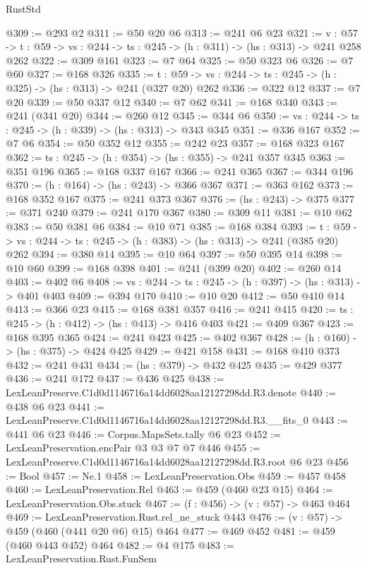 \begin{lexlean}{RustStd}
\begin{coremodule}
@309 := @293 @2
@311 := @50 @20 @6
@313 := @241 @6 @23
@321 := {v : @57} ->
  {t : @59} -> {vs : @244} -> {ts : @245} -> (h : @311) -> (hs : @313) -> @241 @258 @262
@322 := @309 @161
@323 := @7 @64
@325 := @50 @323 @6
@326 := @7 @60
@327 := @168 @326
@335 := {t : @59} -> {vs : @244} -> {ts : @245} -> (h : @325) -> (hs : @313) -> @241 (@327 @20) @262
@336 := @322 @12
@337 := @7 @20
@339 := @50 @337 @12
@340 := @7 @62
@341 := @168 @340
@343 := @241 (@341 @20)
@344 := @260 @12
@345 := @344 @6
@350 := {vs : @244} -> {ts : @245} -> (h : @339) -> (hs : @313) -> @343 @345
@351 := @336 @167
@352 := @7 @6
@354 := @50 @352 @12
@355 := @242 @23
@357 := @168 @323 @167
@362 := {ts : @245} -> (h : @354) -> (hs : @355) -> @241 @357 @345
@363 := @351 @196
@365 := @168 @337 @167
@366 := @241 @365
@367 := @344 @196
@370 := (h : @164) -> (hs : @243) -> @366 @367
@371 := @363 @162
@373 := @168 @352 @167
@375 := @241 @373 @367
@376 := (hs : @243) -> @375
@377 := @371 @240
@379 := @241 @170 @367
@380 := @309 @11
@381 := @10 @62
@383 := @50 @381 @6
@384 := @10 @71
@385 := @168 @384
@393 := {t : @59} -> {vs : @244} -> {ts : @245} -> (h : @383) -> (hs : @313) -> @241 (@385 @20) @262
@394 := @380 @14
@395 := @10 @64
@397 := @50 @395 @14
@398 := @10 @60
@399 := @168 @398
@401 := @241 (@399 @20)
@402 := @260 @14
@403 := @402 @6
@408 := {vs : @244} -> {ts : @245} -> (h : @397) -> (hs : @313) -> @401 @403
@409 := @394 @170
@410 := @10 @20
@412 := @50 @410 @14
@413 := @366 @23
@415 := @168 @381 @357
@416 := @241 @415
@420 := {ts : @245} -> (h : @412) -> (hs : @413) -> @416 @403
@421 := @409 @367
@423 := @168 @395 @365
@424 := @241 @423
@425 := @402 @367
@428 := (h : @160) -> (hs : @375) -> @424 @425
@429 := @421 @158
@431 := @168 @410 @373
@432 := @241 @431
@434 := (hs : @379) -> @432 @425
@435 := @429 @377
@436 := @241 @172
@437 := @436 @425
@438 := LexLeanPreserve.C1d0d1146716a14dd6028aa12127298dd.R3.denote
@440 := @438 @6 @23
@441 := LexLeanPreserve.C1d0d1146716a14dd6028aa12127298dd.R3.__fits_0
@443 := @441 @6 @23
@446 := Corpus.MapsSets.tally @6 @23
@452 := LexLeanPreservation.encPair @3 @3 @7 @7 @446
@455 := LexLeanPreserve.C1d0d1146716a14dd6028aa12127298dd.R3.root @6 @23
@456 := Bool
@457 := Ne.{1}
@458 := LexLeanPreservation.Obs
@459 := @457 @458
@460 := LexLeanPreservation.Rel
@463 := @459 (@460 @23 @15)
@464 := LexLeanPreservation.Obs.stuck
@467 := (f : @456) -> (v : @57) -> @463 @464
@469 := LexLeanPreservation.Rust.rel_ne_stuck @443
@476 := (v : @57) -> @459 (@460 (@441 @20 @6) @15) @464
@477 := @469 @452
@481 := @459 (@460 @443 @452) @464
@482 := @4 @175
@483 := LexLeanPreservation.Rust.FunSem

\end{coremodule}
\end{lexlean}
